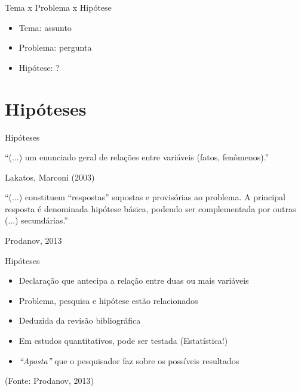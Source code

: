 \documentclass{beamer}
\begin{document}
\begin{frame}{Tema x Problema x Hipótese}
  \begin{itemize}
    \footnotesize
  \item Tema: assunto
    \bigskip
  \item Problema: pergunta
    \bigskip
  \item Hipótese: ?
  \end{itemize}
\end{frame}

\section{Hipóteses}


\begin{frame}{Hipóteses}
  \begin{block}{}
    ``(...) um enunciado geral de \alert{relações entre variáveis}
    (fatos, fenômenos).''

    \vfill
    \scriptsize
    \hfill Lakatos, Marconi (2003)
  \end{block}
  \begin{block}{}
    ``(...) constituem ``respostas'' supostas e provisórias ao
    problema. A principal resposta é denominada hipótese básica,
    podendo ser complementada por outras (...) secundárias.''

    \vfill
    \scriptsize
    \hfill Prodanov, 2013
  \end{block}
\end{frame}

\begin{frame}{Hipóteses}
  \begin{itemize}
    \footnotesize
  \item Declaração que antecipa a relação entre duas ou mais variáveis
    \bigskip
  \item Problema, pesquisa e hipótese estão relacionados
    \bigskip
  \item Deduzida da revisão bibliográfica
    \bigskip
  \item Em estudos quantitativos, pode ser testada (Estatística!)
    \bigskip
  \item {\em ``Aposta''} que o pesquisador faz sobre os possíveis
    resultados
  \end{itemize}

  \vfill
  \scriptsize
  \hfill (Fonte: Prodanov, 2013)
\end{frame}
\end{document}
